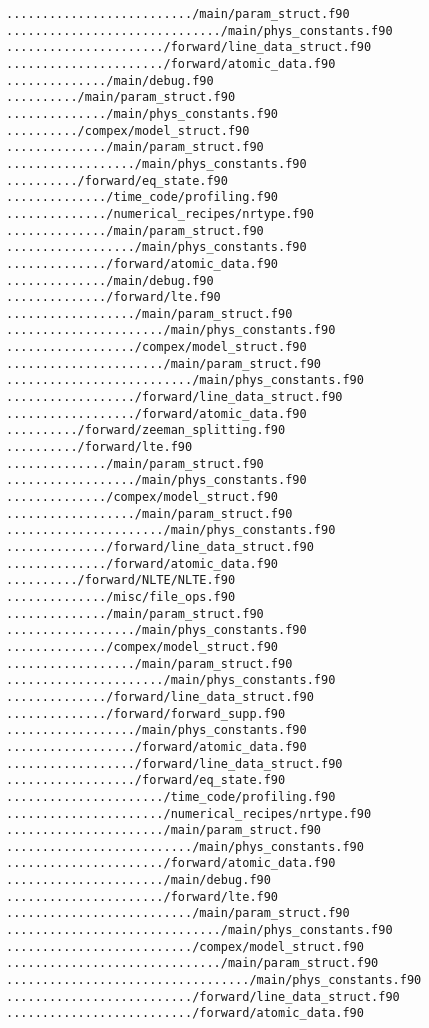 \begin{verbatim}
........................../main/param_struct.f90
............................../main/phys_constants.f90
....................../forward/line_data_struct.f90
....................../forward/atomic_data.f90
............../main/debug.f90
........../main/param_struct.f90
............../main/phys_constants.f90
........../compex/model_struct.f90
............../main/param_struct.f90
................../main/phys_constants.f90
........../forward/eq_state.f90
............../time_code/profiling.f90
............../numerical_recipes/nrtype.f90
............../main/param_struct.f90
................../main/phys_constants.f90
............../forward/atomic_data.f90
............../main/debug.f90
............../forward/lte.f90
................../main/param_struct.f90
....................../main/phys_constants.f90
................../compex/model_struct.f90
....................../main/param_struct.f90
........................../main/phys_constants.f90
................../forward/line_data_struct.f90
................../forward/atomic_data.f90
........../forward/zeeman_splitting.f90
........../forward/lte.f90
............../main/param_struct.f90
................../main/phys_constants.f90
............../compex/model_struct.f90
................../main/param_struct.f90
....................../main/phys_constants.f90
............../forward/line_data_struct.f90
............../forward/atomic_data.f90
........../forward/NLTE/NLTE.f90
............../misc/file_ops.f90
............../main/param_struct.f90
................../main/phys_constants.f90
............../compex/model_struct.f90
................../main/param_struct.f90
....................../main/phys_constants.f90
............../forward/line_data_struct.f90
............../forward/forward_supp.f90
................../main/phys_constants.f90
................../forward/atomic_data.f90
................../forward/line_data_struct.f90
................../forward/eq_state.f90
....................../time_code/profiling.f90
....................../numerical_recipes/nrtype.f90
....................../main/param_struct.f90
........................../main/phys_constants.f90
....................../forward/atomic_data.f90
....................../main/debug.f90
....................../forward/lte.f90
........................../main/param_struct.f90
............................../main/phys_constants.f90
........................../compex/model_struct.f90
............................../main/param_struct.f90
................................../main/phys_constants.f90
........................../forward/line_data_struct.f90
........................../forward/atomic_data.f90

\end{verbatim}

